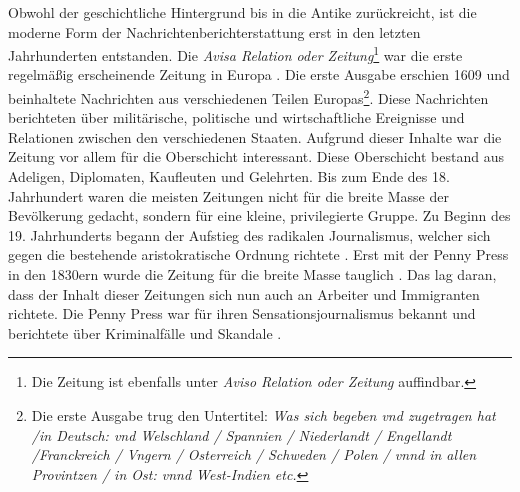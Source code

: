 Obwohl der geschichtliche Hintergrund bis in die Antike zurückreicht, ist die moderne Form der Nachrichtenberichterstattung erst in den letzten Jahrhunderten entstanden.
Die \textit{Avisa Relation oder Zeitung}\footnote{Die Zeitung ist ebenfalls unter \textit{Aviso Relation oder Zeitung} auffindbar.} war die erste regelmäßig erscheinende Zeitung in Europa \cite{aviso-relation-oder-zeitung}.
Die erste Ausgabe erschien 1609 und beinhaltete Nachrichten aus verschiedenen Teilen Europas\footnote{Die erste Ausgabe trug den Untertitel: \textit{Was sich begeben vnd zugetragen hat /in Deutsch: vnd Welschland / Spannien / Niederlandt / Engellandt /Franckreich / Vngern / Osterreich / Schweden / Polen / vnnd in allen Provintzen / in Ost: vnnd West-Indien etc.}}.
Diese Nachrichten berichteten über militärische, politische und wirtschaftliche Ereignisse und Relationen zwischen den verschiedenen Staaten.
Aufgrund dieser Inhalte war die Zeitung vor allem für die Oberschicht interessant.
Diese Oberschicht bestand aus Adeligen, Diplomaten, Kaufleuten und Gelehrten.
Bis zum Ende des 18. Jahrhundert waren die meisten Zeitungen nicht für die breite Masse der Bevölkerung gedacht, sondern für eine kleine, privilegierte Gruppe.
Zu Beginn des 19. Jahrhunderts begann der Aufstieg des radikalen Journalismus, welcher sich gegen die bestehende aristokratische Ordnung richtete \cite{media-democracy}.
Erst mit der Penny Press in den 1830ern wurde die Zeitung für die breite Masse tauglich \cite{precursor-media-penny-press}.
Das lag daran, dass der Inhalt dieser Zeitungen sich nun auch an Arbeiter und Immigranten richtete.
Die Penny Press war für ihren Sensationsjournalismus bekannt und berichtete über Kriminalfälle und Skandale \cite{penny-press}.\\

